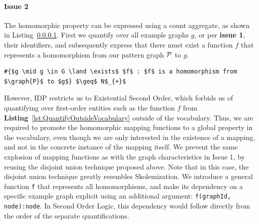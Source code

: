 \paragraph{Issue 2}
The homomorphic property can be expressed using a count aggregate, as shown in Listing~\ref{}. 
First we quantify over all example graphs $g$, or per \textbf{issue 1}, their identifiers, and subsequently express that there must exist a function $f$ that represents a homomorphism from our pattern graph $\mathcal{P}$ to $g$.
\begin{center}
\begin{minipage}{0.64\linewidth}
\begin{lstlisting}[mathescape, caption=Quantifying over functions outside the vocabulary, label=lst:QuantifyOutsideVocabulary]
#{$g \mid g \in G \land \exists$ $f$ : $f$ is a homomorphism from $\graph{P}$ to $g$} $\geq$ N$_{+}$
\end{lstlisting}
\end{minipage}
\end{center}
However, IDP restricts us to Existential Second Order, which forbids us of quantifying over first-order entities such as the function $f$ from \textbf{Listing}~\ref{lst:QuantifyOutsideVocabulary} outside of the vocabulary.
Thus, we are required to promote the homomorphic mapping functions to a global property in the vocabulary, even though we are only interested in the existence of a mapping, and not in the concrete instance of the mapping itself.
We prevent the same explosion of mapping functions as with the graph characteristics in Issue 1, by reusing the disjoint union technique proposed above. 
Note that in this case, the disjoint union technique greatly resembles Skolemization. 
We introduce a general function \verb|f| that represents all homomorphisms, and make its dependency on a specific example graph explicit using an additional argument:
\verb|f(graphId, node):node|.
In Second Order Logic, this dependency would follow directly from the order of the separate quantifications.

